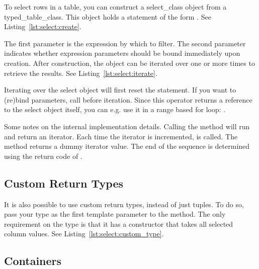 To select rows in a table, you can construct a \gls{select_class} object from a \gls{typed_table_class}. This object holds a statement of the form \newline {}. See Listing~\ref{lst:select:create}.



The first parameter is the expression by which to filter. The second parameter indicates whether expression parameters should be bound immediately upon creation. After construction, the object can be iterated over one or more times to retrieve the results. See Listing~\ref{lst:select:iterate}.



Iterating over the select object will first reset the statement. If you want to (re)bind parameters, call  before iteration. Since this operator returns a reference to the select object itself, you can e.g. use it in a range based for loop: .

Some notes on the internal implementation details. Calling the  method will run  and return an iterator. Each time the iterator is incremented,  is called. The  method returns a dummy iterator value. The end of the sequence is determined using the return code of .

\subsection{Custom Return Types}
\label{section:select:custom}

It is also possible to use custom return types, instead of just tuples. To do so, pass your type as the first template parameter to the  method. The only requirement on the type is that it has a constructor that takes all selected column values. See Listing~\ref{lst:select:custom_type}.



\subsection{Containers}
\label{section:select:container}

